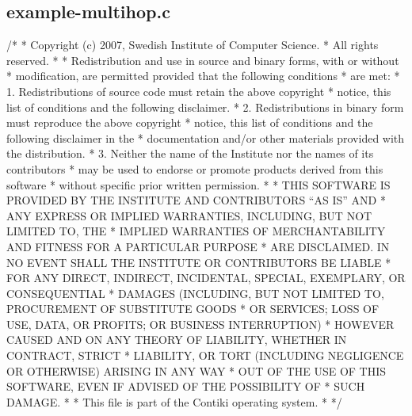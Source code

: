 \hypertarget{a00022}{}\subsection{example-\/multihop.\+c}

\begin{DoxyCodeInclude}
\textcolor{comment}{/*}
\textcolor{comment}{ * Copyright (c) 2007, Swedish Institute of Computer Science.}
\textcolor{comment}{ * All rights reserved.}
\textcolor{comment}{ *}
\textcolor{comment}{ * Redistribution and use in source and binary forms, with or without}
\textcolor{comment}{ * modification, are permitted provided that the following conditions}
\textcolor{comment}{ * are met:}
\textcolor{comment}{ * 1. Redistributions of source code must retain the above copyright}
\textcolor{comment}{ *    notice, this list of conditions and the following disclaimer.}
\textcolor{comment}{ * 2. Redistributions in binary form must reproduce the above copyright}
\textcolor{comment}{ *    notice, this list of conditions and the following disclaimer in the}
\textcolor{comment}{ *    documentation and/or other materials provided with the distribution.}
\textcolor{comment}{ * 3. Neither the name of the Institute nor the names of its contributors}
\textcolor{comment}{ *    may be used to endorse or promote products derived from this software}
\textcolor{comment}{ *    without specific prior written permission.}
\textcolor{comment}{ *}
\textcolor{comment}{ * THIS SOFTWARE IS PROVIDED BY THE INSTITUTE AND CONTRIBUTORS ``AS IS'' AND}
\textcolor{comment}{ * ANY EXPRESS OR IMPLIED WARRANTIES, INCLUDING, BUT NOT LIMITED TO, THE}
\textcolor{comment}{ * IMPLIED WARRANTIES OF MERCHANTABILITY AND FITNESS FOR A PARTICULAR PURPOSE}
\textcolor{comment}{ * ARE DISCLAIMED.  IN NO EVENT SHALL THE INSTITUTE OR CONTRIBUTORS BE LIABLE}
\textcolor{comment}{ * FOR ANY DIRECT, INDIRECT, INCIDENTAL, SPECIAL, EXEMPLARY, OR CONSEQUENTIAL}
\textcolor{comment}{ * DAMAGES (INCLUDING, BUT NOT LIMITED TO, PROCUREMENT OF SUBSTITUTE GOODS}
\textcolor{comment}{ * OR SERVICES; LOSS OF USE, DATA, OR PROFITS; OR BUSINESS INTERRUPTION)}
\textcolor{comment}{ * HOWEVER CAUSED AND ON ANY THEORY OF LIABILITY, WHETHER IN CONTRACT, STRICT}
\textcolor{comment}{ * LIABILITY, OR TORT (INCLUDING NEGLIGENCE OR OTHERWISE) ARISING IN ANY WAY}
\textcolor{comment}{ * OUT OF THE USE OF THIS SOFTWARE, EVEN IF ADVISED OF THE POSSIBILITY OF}
\textcolor{comment}{ * SUCH DAMAGE.}
\textcolor{comment}{ *}
\textcolor{comment}{ * This file is part of the Contiki operating system.}
\textcolor{comment}{ *}
\textcolor{comment}{ */}

\end{DoxyCodeInclude}
